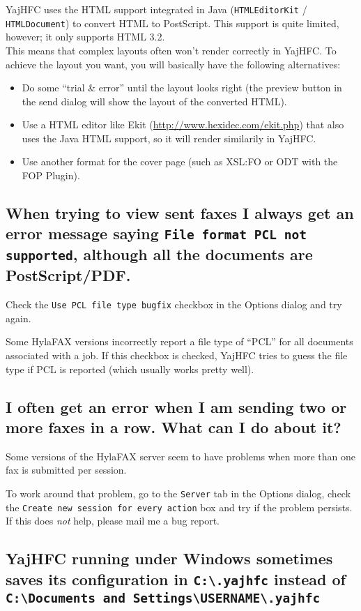 \documentclass[a4paper,10pt]{scrartcl}
\begin{document}
YajHFC uses the HTML support integrated in Java (\texttt{HTMLEditorKit} / \texttt{HTMLDocument}) to convert HTML to PostScript. This support is quite limited, however; it only supports HTML 3.2.\\
This means that complex layouts often won't render correctly in YajHFC.
To achieve the layout you want, you will basically have the following alternatives:

\begin{itemize}
 \item Do some ``trial \& error'' until the layout looks right (the preview button in the send dialog will show the layout of the converted HTML).
 \item Use a HTML editor like Ekit (\url{http://www.hexidec.com/ekit.php}) that also uses the Java HTML support, so it will render similarily in YajHFC.
 \item Use another format for the cover page (such as XSL:FO or ODT with the FOP Plugin).
\end{itemize}

\subsection{When trying to view sent faxes I always get an error message saying 
   \texttt{File format PCL not supported}, although all the documents are PostScript/PDF.}

Check the \texttt{Use PCL file type bugfix} checkbox in the Options dialog and try again.

Some HylaFAX versions incorrectly report a file type of ``PCL'' for all documents
associated with a job. If this checkbox is checked, YajHFC tries to guess the
file type if PCL is reported (which usually works pretty well).

\subsection{I often get an error when I am sending two or more faxes in a row. What can I do about it?}

Some versions of the HylaFAX server seem to have problems when more than one fax is submitted per session.

To work around that problem, go to the \texttt{Server} tab in the Options dialog, check the \texttt{Create new session for every action} box and try if the problem persists.
If this does \emph{not} help, please mail me a bug report.

\subsection{YajHFC running under Windows sometimes saves its configuration in \texttt{C:\textbackslash .yajhfc} instead of \texttt{C:\textbackslash Documents and Settings\textbackslash USERNAME\textbackslash .yajhfc}}
\end{document}
